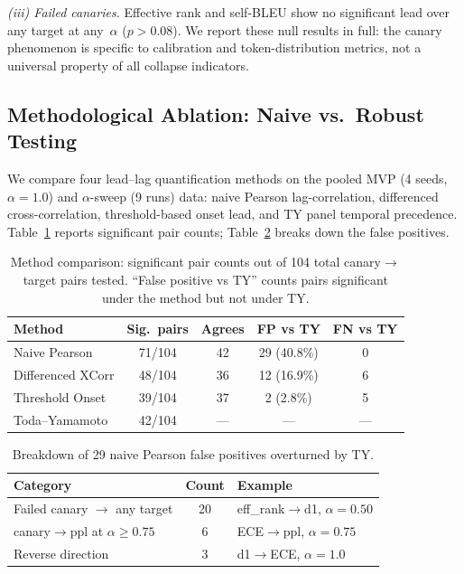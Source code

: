 \documentclass[letterpaper,11pt]{article}
\begin{document}
\textit{(iii) Failed canaries.}
Effective rank and self-BLEU show no significant lead over any target at any~$\alpha$ ($p > 0.08$). We report these null results in full: the canary phenomenon is specific to calibration and token-distribution metrics, not a universal property of all collapse indicators.

\subsection{Methodological Ablation: Naive vs.\ Robust Testing}
\label{sec:method_ablation}

We compare four lead--lag quantification methods on the pooled MVP (4 seeds, $\alpha=1.0$) and $\alpha$-sweep (9 runs) data: naive Pearson lag-correlation, differenced cross-correlation, threshold-based onset lead, and TY panel temporal precedence. Table~\ref{tab:method_comparison} reports significant pair counts; Table~\ref{tab:false_positives} breaks down the false positives.

\begin{table}[t]
\centering
\caption{Method comparison: significant pair counts out of 104 total canary$\to$target pairs tested. ``False positive vs TY'' counts pairs significant under the method but not under TY.}
\label{tab:method_comparison}
\small
\begin{tabular}{@{}lcccc@{}}
\toprule
Method & Sig.\ pairs & Agrees & FP vs TY & FN vs TY \\
\midrule
Naive Pearson     & 71/104 & 42 & 29 (40.8\%) & 0 \\
Differenced XCorr & 48/104 & 36 & 12 (16.9\%) & 6 \\
Threshold Onset   & 39/104 & 37 &  2 (2.8\%)  & 5 \\
Toda--Yamamoto    & 42/104 & --- & ---         & --- \\
\bottomrule
\end{tabular}
\end{table}

\begin{table}[t]
\centering
\caption{Breakdown of 29 naive Pearson false positives overturned by TY.}
\label{tab:false_positives}
\small
\begin{tabular}{@{}lcp{3.5cm}@{}}
\toprule
Category & Count & Example \\
\midrule
Failed canary $\to$ any target & 20 & eff\_rank$\to$d1, $\alpha\!=\!0.50$ \\
canary$\to$ppl at $\alpha\!\ge\!0.75$ & 6 & ECE$\to$ppl, $\alpha\!=\!0.75$ \\
Reverse direction & 3 & d1$\to$ECE, $\alpha\!=\!1.0$ \\
\bottomrule
\end{tabular}
\end{table}
\end{document}
